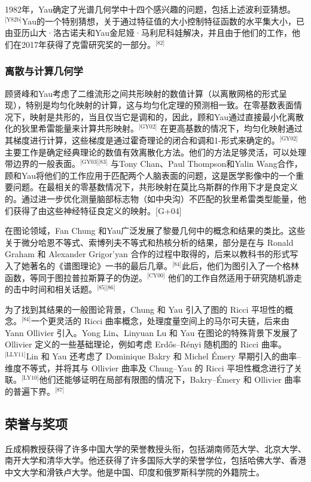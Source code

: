 1982年，Yau确定了光谱几何学中十四个感兴趣的问题，包括上述波利亚猜想。\(^\text{[Y82b]}\)Yau的一个特别猜想，关于通过特征值的大小控制特征函数的水平集大小，已由亚历山大·洛古诺夫和Yau金尼娅·马利尼科娃解决，并且由于他们的工作，他们在2017年获得了克雷研究奖的一部分。\(^\text{[82]}\)
\subsubsection{离散与计算几何学}
顾贤峰和Yau考虑了二维流形之间共形映射的数值计算（以离散网格的形式呈现），特别是均匀化映射的计算，这与均匀化定理的预测相一致。在零基数表面情况下，映射是共形的，当且仅当它是调和的，因此，顾和Yau通过直接最小化离散化的狄里希雷能量来计算共形映射。\(^\text{[GY02]}\) 在更高基数的情况下，均匀化映射通过其梯度进行计算，这些梯度是通过霍奇理论的闭合和调和1-形式来确定的。\(^\text{[GY02]}\)主要工作是确定经典理论的数值有效离散化方法。他们的方法足够灵活，可以处理带边界的一般表面。\(^\text{[GY03][83]}\) 与Tony Chan、Paul Thompson和Yalin Wang合作，顾和Yau将他们的工作应用于匹配两个人脑表面的问题，这是医学影像中的一个重要问题。在最相关的零基数情况下，共形映射在莫比乌斯群的作用下才是良定义的。通过进一步优化测量脑部标志物（如中央沟）不匹配的狄里希雷类型能量，他们获得了由这些神经特征良定义的映射。[G+04]

在图论领域，Fan Chung 和Yau广泛发展了黎曼几何中的概念和结果的类比。这些关于微分哈恩不等式、索博列夫不等式和热核分析的结果，部分是在与 Ronald Graham 和 Alexander Grigor'yan 合作的过程中取得的，后来以教科书的形式写入了她著名的《谱图理论》一书的最后几章。\(^\text{[84]}\)此后，他们为图引入了一个格林函数，等同于图拉普拉斯算子的伪逆。\(^\text{[CY00]}\) 他们的工作自然适用于研究随机游走的击中时间和相关话题。\(^\text{[85][86]}\)

为了找到其结果的一般图论背景，Chung 和 Yau 引入了图的 Ricci 平坦性的概念。\(^\text{[84]}\)一个更灵活的 Ricci 曲率概念，处理度量空间上的马尔可夫链，后来由 Yann Ollivier 引入。Yong Lin、Linyuan Lu 和 Yau 在图论的特殊背景下发展了 Ollivier 定义的一些基础理论，例如考虑 Erdős–Rényi 随机图的 Ricci 曲率。\(^\text{[LLY11]}\)Lin 和 Yau 还考虑了 Dominique Bakry 和 Michel Émery 早期引入的曲率–维度不等式，并将其与 Ollivier 曲率及 Chung–Yau 的 Ricci 平坦性概念进行了关联。\(^\text{[LY10]}\)他们还能够证明在局部有限图的情况下，Bakry–Émery 和 Ollivier 曲率的普遍下界。\(^\text{[87]}\)
\subsection{荣誉与奖项}  
丘成桐教授获得了许多中国大学的荣誉教授头衔，包括湖南师范大学、北京大学、南开大学和清华大学。他还获得了许多国际大学的荣誉学位，包括哈佛大学、香港中文大学和滑铁卢大学。他是中国、印度和俄罗斯科学院的外籍院士。

